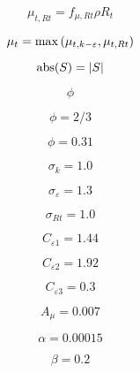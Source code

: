 \begin{equation}
\mu_{t,Rt} = f_{\mu,Rt} \rho R_t
\end{equation}

\begin{equation}
\mu_t = {\rm max} \left( \mu_{t,k-\varepsilon},\mu_{t,Rt} \right)
\end{equation}

\begin{equation}
{\rm abs}(S) = |S|
\end{equation}

\begin{equation}
\phi
\end{equation}

\begin{equation}
\phi = 2/3
\end{equation}

\begin{equation}
\phi = 0.31
\end{equation}

\begin{equation}
\sigma_k = 1.0
\end{equation}

\begin{equation}
\sigma_{\varepsilon} = 1.3
\end{equation}

\begin{equation}
\sigma_{Rt} = 1.0
\end{equation}

\begin{equation}
C_{\varepsilon 1} = 1.44
\end{equation}

\begin{equation}
C_{\varepsilon 2} = 1.92
\end{equation}

\begin{equation}
C_{\varepsilon 3} = 0.3
\end{equation}

\begin{equation}
A_{\mu} = 0.007
\end{equation}

\begin{equation}
\alpha = 0.00015
\end{equation}

\begin{equation}
\beta = 0.2
\end{equation}

